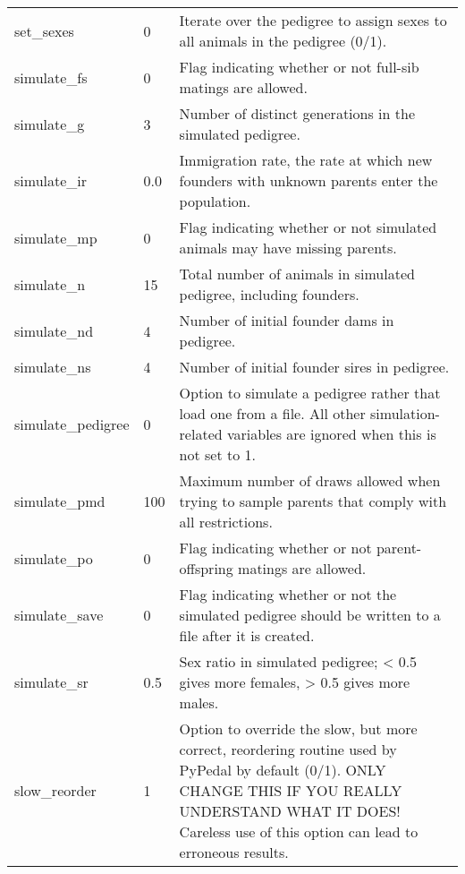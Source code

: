 \begin{center}
\begin{xtabular}{l|l|p{4in}}
	set\_sexes       & 0            & Iterate over the pedigree to assign sexes to all animals in the pedigree (0/1). \\
	simulate\_fs     & 0            & Flag indicating whether or not full-sib matings are allowed. \\
	simulate\_g      & 3            & Number of distinct generations in the simulated pedigree. \\
	simulate\_ir     & 0.0          & Immigration rate, the rate at which new founders with unknown parents enter the population. \\
	simulate\_mp     & 0            & Flag indicating whether or not simulated animals may have missing parents. \\
	simulate\_n      & 15           & Total number of animals in simulated pedigree, including founders. \\
	simulate\_nd     & 4            & Number of initial founder dams in pedigree. \\
	simulate\_ns     & 4            & Number of initial founder sires in pedigree. \\
	simulate\_pedigree & 0          & Option to simulate a pedigree rather that load one from a file. All other simulation-related variables are ignored when this is not set to 1. \\
	simulate\_pmd    & 100          & Maximum number of draws allowed when trying to sample parents that comply with all restrictions. \\
	simulate\_po     & 0            & Flag indicating whether or not parent-offspring matings are allowed. \\
	simulate\_save   & 0            & Flag indicating whether or not the simulated pedigree should be written to a file after it is created. \\
	simulate\_sr     & 0.5          & Sex ratio in simulated pedigree; < 0.5 gives more females, > 0.5 gives more males. \\
	slow\_reorder    & 1            & Option to override the slow, but more correct, reordering routine used by PyPedal by default (0/1).  ONLY CHANGE THIS IF YOU REALLY UNDERSTAND WHAT IT DOES!  Careless use of this option can lead to erroneous results. \\
    \end{xtabular}
\end{center}
